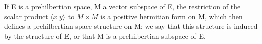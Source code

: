 If E is a prehilbertian space, M a vector subspace of E, the restriction of the scalar product \(\langle x|y\rangle\) to \(M \times M\) is a positive hermitian form on M, which then defines a prehilbertian space structure on M; we say that this structure is induced by the structure of E, or that M is a prehilbertian subspace of E.

